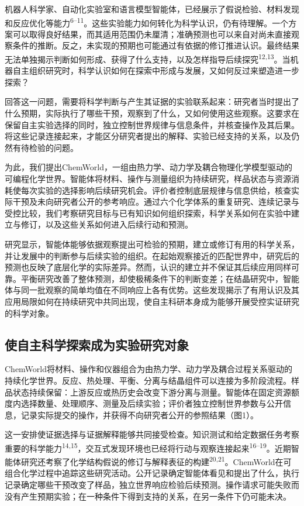 \documentclass[10pt,a4paper]{article}
\begin{document}
机器人科学家、自动化实验室和语言模型智能体，已经展示了假说检验、材料发现和反应优化等能力\textsuperscript{6--11}。这些实验能力如何转化为科学认识，仍有待理解。一个方案可以取得良好结果，而其适用范围仍未厘清；准确预测也可以来自对尚未直接观察条件的推断。反之，未实现的预期也可能通过有依据的修订推进认识。最终结果无法单独揭示判断如何形成、获得了什么支持，以及怎样指导后续探究\textsuperscript{12,13}。当机器自主组织研究时，科学认识如何在探索中形成与发展，又如何反过来塑造进一步探索？

回答这一问题，需要将科学判断与产生其证据的实验联系起来：研究者当时提出了什么预期，实际执行了哪些干预，观察到了什么，又如何使用这些观察。这要求在保留自主实验选择的同时，独立控制世界规律与信息条件，并核查操作及其后果。将这些记录连接起来，才能区分研究者提出的解释、实验已经支持的关系，以及仍然有待检验的问题。

为此，我们提出ChemWorld，一组由热力学、动力学及耦合物理化学模型驱动的可编程化学世界。智能体将材料、操作与测量组织为持续研究，样品状态与资源消耗使每次实验的选择影响后续研究机会。评价者控制底层规律与信息供给，核查实际干预及未向研究者公开的参考响应。通过六个化学体系的重复研究、连续记录与受控比较，我们考察研究目标与已有知识如何组织探索，科学关系如何在实验中建立与修订，以及这些关系如何进入后续行动和预测。

研究显示，智能体能够依据观察提出可检验的预期，建立或修订有用的科学关系，并让发展中的判断参与后续实验的组织。在起始观察接近的匹配世界中，研究后的预测也反映了底层化学的实际差异。然而，认识的建立并不保证其后续应用同样可靠。平衡研究改善了整体预测，却使极稀条件下的判断变差；在结晶研究中，智能体与同一批观察的简单均值在不同响应上各有优势。这些发现揭示了有用认识及其应用局限如何在持续研究中共同出现，使自主科研本身成为能够开展受控实证研究的科学对象。

\subsection{使自主科学探索成为实验研究对象}\label{ux4f7fux81eaux4e3bux79d1ux5b66ux63a2ux7d22ux6210ux4e3aux5b9eux9a8cux7814ux7a76ux5bf9ux8c61}

ChemWorld将材料、操作和仪器组合为由热力学、动力学及耦合过程关系驱动的持续化学世界。反应、热处理、平衡、分离与结晶组件可以连接为多阶段流程。样品状态持续保留：上游反应或热历史会改变下游分离与测量。智能体在固定资源额度内选择数量、处理顺序、测量及后续实验；评价者独立控制世界参数与公开信息，记录实际提交的操作，并获得不向研究者公开的参照结果（图1）。

这一安排使证据选择与证据解释能够共同接受检查。知识测试和给定数据任务考察重要的科学能力\textsuperscript{14,15}，交互式发现环境也已经将行动与观察连接起来\textsuperscript{16--19}。近期智能体研究还考察了化学结构假说的修订与解释表征的构建\textsuperscript{20,21}。ChemWorld在可组合化学过程中追踪这些研究活动。公开记录确定智能体看见和提出了什么，执行记录确定哪些干预改变了样品，独立世界响应检验后续预测。操作请求可能失败而没有产生预期实验；在一种条件下得到支持的关系，在另一条件下仍可能未决。
\end{document}
